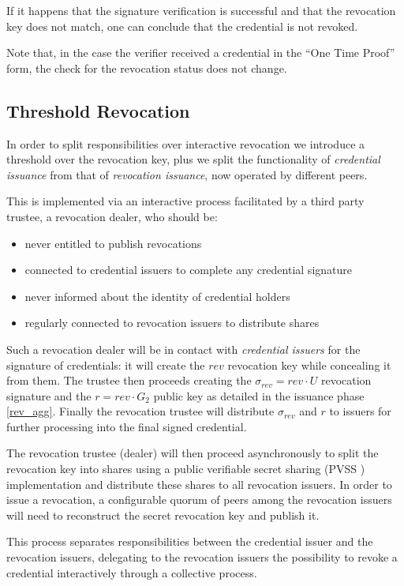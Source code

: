If it happens that the signature verification is successful and that
the revocation key does not match, one can conclude that the
credential is not revoked.

Note that, in the case the verifier received a credential in the ``One
Time Proof'' form, the check for the revocation status does not
change.

\subsection{Threshold Revocation}

In order to split responsibilities over interactive revocation we
introduce a threshold over the revocation key, plus we split the
functionality of \textit{credential issuance} from that of
\textit{revocation issuance}, now operated by different peers.

This is implemented via an interactive process facilitated by a third
party trustee, a revocation dealer, who should be:
\begin{itemize}
    \item never entitled to publish revocations
    \item connected to credential issuers to complete any credential
      signature
    \item never informed about the identity of credential holders
    \item regularly connected to revocation issuers to distribute
      shares
\end{itemize}

Such a revocation dealer will be in contact with \textit{credential
 issuers} for the signature of credentials: it will create the $rev$
revocation key while concealing it from them. The trustee then
proceeds creating the $\sigma_{rev} = rev \cdot U$ revocation
signature and the $r = rev \cdot G_2$ public key as detailed in the
issuance phase \eqref{rev_agg}. Finally the revocation trustee will
distribute $\sigma_{rev}$ and $r$ to issuers for further processing
into the final signed credential.

The revocation trustee (dealer) will then proceed asynchronously to
split the revocation key into shares using a public verifiable secret
sharing (PVSS \cite{pvss}) implementation and distribute these shares
to all revocation issuers. In order to issue a revocation, a
configurable quorum of peers among the revocation issuers will need to
reconstruct the secret revocation key and publish it.

This process separates responsibilities between the credential issuer
and the revocation issuers, delegating to the revocation issuers the
possibility to revoke a credential interactively through a collective
process.

